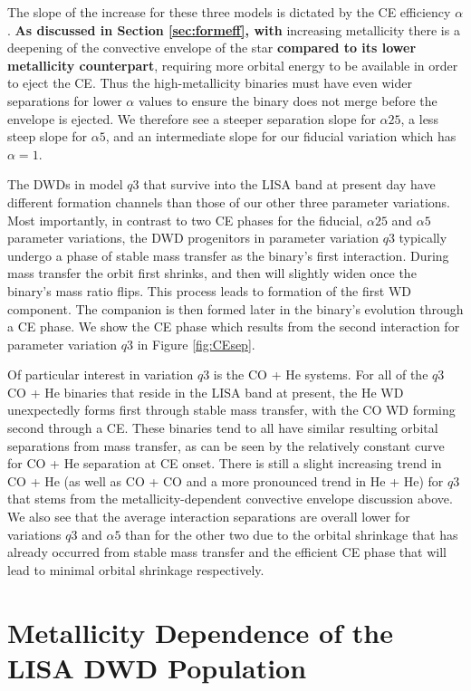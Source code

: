 \documentclass[twocolumn, linenumbers]{aastex631}
\begin{document}
The slope of the increase for these three models is dictated by the CE efficiency $\alpha$. \textbf{As discussed in Section \ref{sec:formeff}, with} increasing metallicity there is a deepening of the convective envelope of the star \textbf{compared to its lower metallicity counterpart}, requiring more orbital energy to be available in order to eject the CE. Thus the high-metallicity binaries must have even wider separations for lower $\alpha$ values to ensure the binary does not merge before the envelope is ejected. We therefore see a steeper separation slope for $\alpha25$, a less steep slope for $\alpha5$, and an intermediate slope for our fiducial variation which has $\alpha=1$.

The DWDs in model $q3$ that survive into the LISA band at present day have different formation channels than those of our other three parameter variations. Most importantly, in contrast to two CE phases for the fiducial, $\alpha25$ and $\alpha5$ parameter variations, the DWD progenitors in parameter variation $q3$ typically undergo a phase of stable mass transfer as the binary's first interaction. During mass transfer the orbit first shrinks, and then will slightly widen once the binary's mass ratio flips. This process leads to formation of the first WD component. The companion is then formed later in the binary's evolution through a CE phase. We show the CE phase which results from the second interaction for parameter variation $q3$ in Figure \ref{fig:CEsep}.

Of particular interest in variation $q3$ is the CO + He systems. For all of the $q3$ CO + He binaries that reside in the LISA band at present, the He WD unexpectedly forms first through stable mass transfer, with the CO WD forming second through a CE. These binaries tend to all have similar resulting orbital separations from mass transfer, as can be seen by the relatively constant curve for CO + He separation at CE onset. There is still a slight increasing trend in CO + He (as well as CO + CO and a more pronounced trend in He + He) for $q3$ that stems from the metallicity-dependent convective envelope discussion above. We also see that the average interaction separations are overall lower for variations $q3$ and $\alpha5$ than for the other two due to the orbital shrinkage that has already occurred from stable mass transfer and the efficient CE phase that will lead to minimal orbital shrinkage respectively.

\section{Metallicity Dependence of the LISA DWD Population}
\label{sec:LISA_met}
\end{document}
